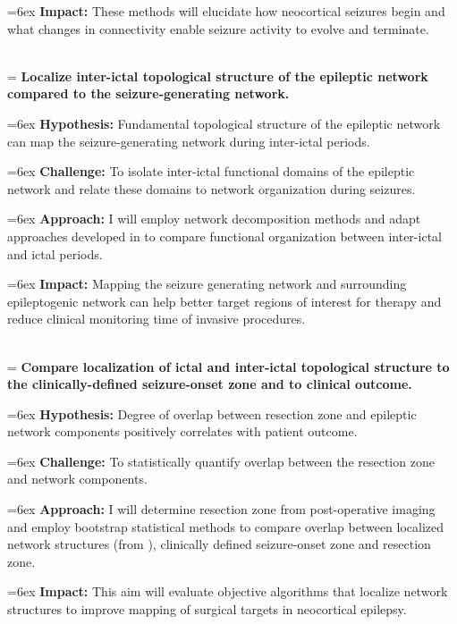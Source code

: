 \hangindent=6ex
\textbf{Impact:} These methods will elucidate how neocortical seizures begin and what changes in connectivity enable seizure activity to evolve and terminate.

~\\
\hangindent=\parindent
{}
\noindent
{} \textbf{Localize inter-ictal topological structure of the epileptic network compared to the seizure-generating network.}

\hangindent=6ex
\textbf{Hypothesis:} Fundamental topological structure of the epileptic network can map the seizure-generating network during inter-ictal periods.

\hangindent=6ex
\textbf{Challenge:} To isolate inter-ictal functional domains of the epileptic network and relate these domains to network organization during seizures.

\hangindent=6ex
\textbf{Approach:} I will employ network decomposition methods and adapt approaches developed in  to compare functional organization between inter-ictal and ictal periods.

\hangindent=6ex
\textbf{Impact:} Mapping the seizure generating network and surrounding epileptogenic network can help better target regions of interest for therapy and reduce clinical monitoring time of invasive procedures.

~\\
\hangindent=\parindent
{}
\noindent
{} \textbf{Compare localization of ictal and inter-ictal topological structure to the clinically-defined seizure-onset zone and to clinical outcome.}

\hangindent=6ex
\textbf{Hypothesis:} Degree of overlap between resection zone and epileptic network components positively correlates with patient outcome.

\hangindent=6ex
\textbf{Challenge:} To statistically quantify overlap between the resection zone and network components.

\hangindent=6ex
\textbf{Approach:} I will determine resection zone from post-operative imaging and employ bootstrap statistical methods to compare overlap between localized network structures (from ), clinically defined seizure-onset zone and resection zone.

\hangindent=6ex
\textbf{Impact:} This aim will evaluate objective algorithms that localize network structures to improve mapping of surgical targets in neocortical epilepsy.
